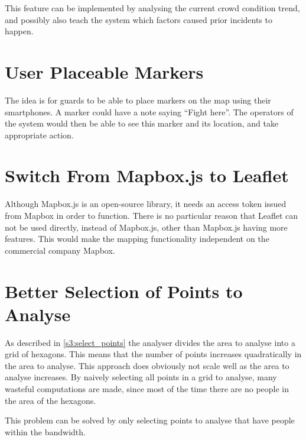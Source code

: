 This feature can be implemented by analysing the current crowd condition trend, and possibly also teach the system which factors caused prior incidents to happen.

\section{User Placeable Markers}
The idea is for guards to be able to place markers on the map using their smartphones. A marker could have a note saying \enquote{Fight here}. The operators of the system would then be able to see this marker and its location, and take appropriate action.

\section{Switch From Mapbox.js to Leaflet}
Although Mapbox.js is an open-source library, it needs an access token issued from Mapbox in order to function. There is no particular reason that Leaflet can not be used directly, instead of Mapbox.js, other than Mapbox.js having more features. This would make the mapping functionality independent on the commercial company Mapbox.

\section{Better Selection of Points to Analyse}
As described in \cref{s3:select_points} the analyser divides the area to analyse into a grid of hexagons. This means that the number of points increases quadratically in the area to analyse.  This approach does obviously not scale well as the area to analyse increases. By naively selecting all points in a grid to analyse, many wasteful computations are made, since most of the time there are no people in the area of the hexagons.

This problem can be solved by only selecting points to analyse that have people within the bandwidth.